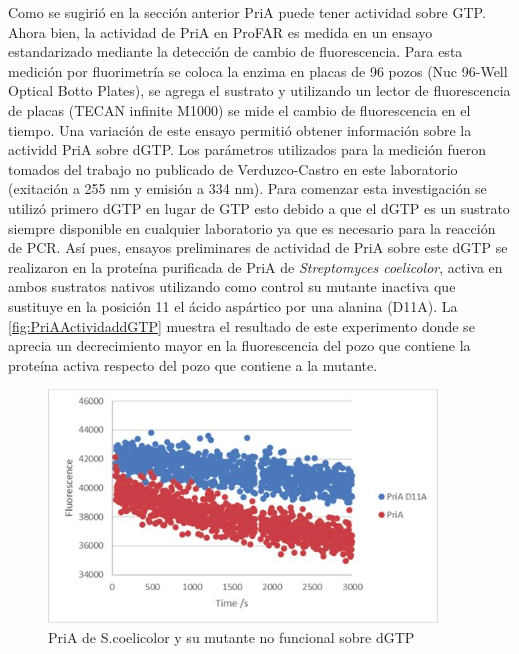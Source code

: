 \documentclass[12pt,twoside]{reedthesis}
\begin{document}
  Como se sugirió en la sección anterior PriA puede tener actividad sobre
  GTP. Ahora bien, la actividad de PriA en ProFAR es medida en un ensayo
  estandarizado mediante la detección de cambio de fluorescencia. Para
  esta medición por fluorimetría se coloca la enzima en placas de 96 pozos
  (Nuc 96-Well Optical Botto Plates), se agrega el sustrato y utilizando
  un lector de fluorescencia de placas (TECAN infinite M1000) se mide el
  cambio de fluorescencia en el tiempo. Una variación de este ensayo
  permitió obtener información sobre la actividd PriA sobre dGTP. Los
  parámetros utilizados para la medición fueron tomados del trabajo no
  publicado de Verduzco-Castro en este laboratorio (exitación a 255 nm y
  emisión a 334 nm). Para comenzar esta investigación se utilizó primero
  dGTP en lugar de GTP esto debido a que el dGTP es un sustrato siempre
  disponible en cualquier laboratorio ya que es necesario para la reacción
  de PCR. Así pues, ensayos preliminares de actividad de PriA sobre este
  dGTP se realizaron en la proteína purificada de PriA de
  \emph{Streptomyces coelicolor}, activa en ambos sustratos nativos
  utilizando como control su mutante inactiva que sustituye en la posición
  11 el ácido aspártico por una alanina (D11A). La
  \autoref{fig:PriAActividaddGTP} muestra el resultado de este experimento
  donde se aprecia un decrecimiento mayor en la fluorescencia del pozo que
  contiene la proteína activa respecto del pozo que contiene a la mutante.
  
  \begin{figure}[h!tbp]
  \centering
  \includegraphics[angle = 0,scale = 0.8]{chapter4/MutantControl.png}
  \caption[PriA de {S.}{coelicolor} y su mutante no funcional sobre dGTP]{\footnotesize{PriA de {S.}{coelicolor} y su mutante no funcional sobre dGTP}}
  \label{fig:PriAActividaddGTP}
  \end{figure}
  
\end{document}
